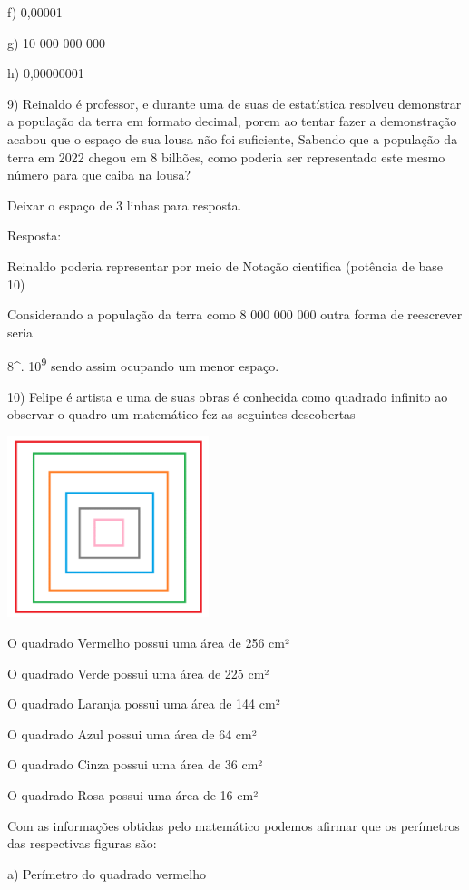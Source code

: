 f) 0,00001

g) 10 000 000 000

h) 0,00000001

9) Reinaldo é professor, e durante uma de suas de estatística resolveu
demonstrar a população da terra em formato decimal, porem ao tentar
fazer a demonstração acabou que o espaço de sua lousa não foi
suficiente, Sabendo que a população da terra em 2022 chegou em 8
bilhões, como poderia ser representado este mesmo número para que caiba
na lousa?

Deixar o espaço de 3 linhas para resposta.

Resposta:

Reinaldo poderia representar por meio de Notação cientifica (potência de
base 10)

Considerando a população da terra como 8 000 000 000 outra forma de
reescrever seria

8^{.} 10\textsuperscript{9} sendo assim ocupando um
menor espaço.

10) Felipe é artista e uma de suas obras é conhecida como quadrado
infinito ao observar o quadro um matemático fez as seguintes descobertas

\includegraphics[width=2.3125in,height=2.07917in]{./imgSAEB_8_MAT/media/image2.png}

O quadrado Vermelho possui uma área de 256 cm²

O quadrado Verde possui uma área de 225 cm²

O quadrado Laranja possui uma área de 144 cm²

O quadrado Azul possui uma área de 64 cm²

O quadrado Cinza possui uma área de 36 cm²

O quadrado Rosa possui uma área de 16 cm²

Com as informações obtidas pelo matemático podemos afirmar que os
perímetros das respectivas figuras são:

a) Perímetro do quadrado vermelho

